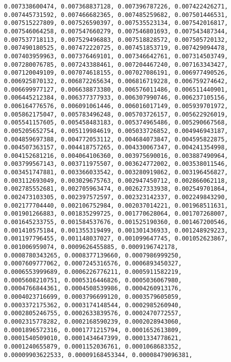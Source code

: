 \documentclass[12pt]{article}
\begin{document}
\begin{verbatim}
0.007338600474, 0.007368837128, 0.007396787226, 0.007422426271, 
0.007445731592, 0.007466682365, 0.007485259682, 0.007501446531, 
0.007515227809, 0.007526590397, 0.007535523134, 0.007542016817, 
0.007546064258, 0.007547660279, 0.007546801693, 0.007543487344, 
0.007537718113, 0.007529496883, 0.007518828572, 0.007505720132, 
0.007490180525, 0.007472220725, 0.007451853719, 0.007429094478, 
0.007403959963, 0.007376469101, 0.007346642761, 0.007314503749, 
0.007280076785, 0.007243388461, 0.007204467240, 0.007163343427, 
0.007120049109, 0.007074618155, 0.007027086191, 0.006977490526, 
0.006925870132, 0.006872265634, 0.006816719228, 0.006759274642, 
0.006699977127, 0.006638873380, 0.006576011486, 0.006511440901, 
0.006445212384, 0.006377377933, 0.006307990746, 0.006237105156, 
0.006164776576, 0.006091061446, 0.006016017149, 0.005939701972, 
0.005862175047, 0.005783496248, 0.005703726157, 0.005622926019, 
0.005541157605, 0.005458483183, 0.005374965486, 0.005290667568, 
0.005205652754, 0.005119984619, 0.005033726852, 0.004946943187, 
0.004859697388, 0.004772053112, 0.004684073847, 0.004595822875, 
0.004507363157, 0.004418757265, 0.004330067347, 0.004241354998, 
0.004152681216, 0.004064106360, 0.003975690016, 0.003887490964, 
0.003799567143, 0.003711975507, 0.003624772002, 0.003538011546, 
0.003451747881, 0.003366033542, 0.003280919862, 0.003196456827,
0.003112693049, 0.003029675763, 0.002947450712, 0.002866062118, 
0.002785552681, 0.002705963474, 0.002627333938, 0.002549701864, 
0.002473103305, 0.002397572597, 0.002323142337, 0.002249843290, 
0.002177704440, 0.002106752984, 0.002037014221, 0.001968511631, 
0.001901266883, 0.001835299725, 0.001770628064, 0.001707268007, 
0.001645233755, 0.001584537676, 0.001525190360, 0.001467200546, 
0.001410575184, 0.001355319499, 0.001301436933, 0.001248929223, 
0.001197796455, 0.001148037027, 0.001099647745, 0.001052623867, 
0.001006959074, 0.0009626455885, 0.0009196742178, 
0.0008780343265, 0.0008377139660, 0.0007986999250, 
0.0007609777062, 0.0007245316576, 0.0006893450327, 
0.0006553999689, 0.0006226776211, 0.0005911582219, 
0.0005608210751, 0.0005316446826, 0.0005036067980, 
0.0004766844361, 0.0004508539986, 0.0004260913176, 
0.0004023716699, 0.0003796699120, 0.0003579605059, 
0.0003372175362, 0.0003174148544, 0.0002985260940, 
0.0002805246755, 0.0002633839576, 0.0002470772557, 
0.0002315778282, 0.0002168590239, 0.0002028943060, 
0.0001896572316, 0.0001771215794, 0.0001652613809, 
0.0001540509010, 0.0001434647399, 0.0001334778621, 
0.0001240655879, 0.0001152036761, 0.0001068683352, 
0.00009903622533, 0.00009168453344, 0.00008479096381, 

\end{verbatim}
\end{document}
